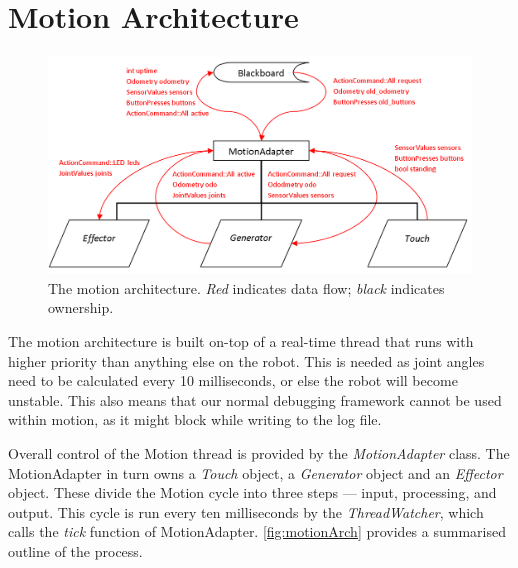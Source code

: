 \documentclass[pdftex,11pt,a4paper]{report}
\begin{document}
\section{Motion Architecture}
\begin{figure}[ht]
    \begin{center}
        \includegraphics[width=\textwidth]{figures/motion_arch}
    \end{center}
    \caption{The motion architecture. \emph{Red} indicates data flow;
    \emph{black} indicates ownership.}
    \label{fig:motionArch}
\end{figure}

The motion architecture is built on-top of a real-time thread that runs
with higher priority than anything else on the robot. This is needed as
joint angles need to be calculated every 10 milliseconds, or else the robot
will become unstable. This also means that our normal debugging framework
cannot be used within motion, as it might block while writing to the log
file.

Overall control of the Motion thread is provided by the
\emph{MotionAdapter} class. The MotionAdapter in turn owns a
\emph{Touch} object, a \emph{Generator} object and an \emph{Effector}
object. These divide the Motion cycle into three steps --- input, processing,
and output. This cycle is run every ten milliseconds by the
\emph{ThreadWatcher}, which calls the \emph{tick} function of
MotionAdapter. \autoref{fig:motionArch} provides a summarised outline of
the process.
\end{document}
